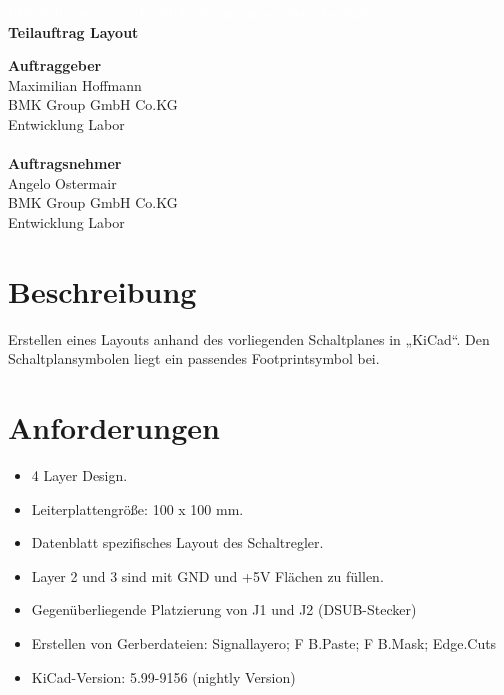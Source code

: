 \documentclass[a4paper,11pt]{scrartcl}
\begin{document}
\begin{center}
	\begin{huge}
	\textcolor{white}{\tiny{Platzhalter wenn ein Kapitel auf einer neuen Seite beginnt\\}}
	\textbf{Teilauftrag Layout}
	\end{huge}
\end{center}

\textbf{Auftraggeber}	\\
Maximilian Hoffmann		\\
BMK Group GmbH Co.KG	\\
Entwicklung Labor		\\
\\

\textbf{Auftragsnehmer}	\\
Angelo Ostermair		\\
BMK Group GmbH Co.KG	\\
Entwicklung Labor		\\

\section{Beschreibung}
Erstellen eines Layouts anhand des vorliegenden Schaltplanes in „KiCad“. Den Schaltplansymbolen liegt ein passendes Footprintsymbol bei.

\section{Anforderungen}

\begin{itemize}
	\item{4 Layer Design.}
	
	\item{Leiterplattengröße: 100 x 100 mm.}
	
	\item{Datenblatt spezifisches Layout des Schaltregler.}
	
	\item{Layer 2 und 3 sind mit \glqq GND \grqq{} und \glqq +5V \grqq{} Flächen zu füllen.}
	
	\item{Gegenüberliegende Platzierung von J1 und J2 (DSUB-Stecker)}
	
	\item{Erstellen von Gerberdateien: Signallayero; F B.Paste;	F B.Mask; Edge.Cuts}
	
	\item{KiCad-Version: 5.99-9156 (nightly Version)}
\end{itemize}
\end{document}

